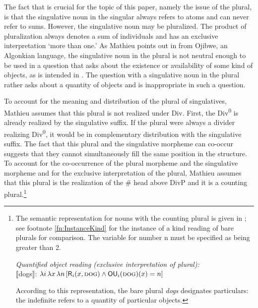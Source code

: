 \documentclass[output=paper,colorlinks,citecolor=brown,
]{langscibook}
\newcommand{\sib}[1]{$\llbracket${#1}$\rrbracket$} %
\newcommand{\cnst}[1]{\textsf{\MakeUppercase{#1}}} %
\begin{document}
The fact that is crucial for the topic of this paper, namely the issue of the plural, is that the singulative noun in the singular always refers to atoms and can never refer to sums. However, the singulative noun may be pluralized. The product of pluralization always denotes a sum of individuals and has an exclusive interpretation `more than one.' As Mathieu points out in  from Ojibwe, an Algonkian language, the singulative noun in the plural is not neutral enough to be used in a question that asks about the existence or availability of some kind of objects, as is intended in . The question with a singulative noun in the plural rather asks about a quantity of objects and is inappropriate in such a question. 

\label{ex:23}
\z
	   
\noindent To account for the meaning and distribution of the plural of singulatives, Mathieu assumes that this plural is not realized under Div. First, the Div\textsuperscript{0} is already realized by the singulative suffix. If the plural were always a divider realizing Div\textsuperscript{0}, it would be in complementary distribution with the singulative suffix. The fact that this plural and the singulative morpheme can co-occur suggests that they cannot simultaneously fill the same position in the structure. To account for the co-occurrence of the plural morpheme and the singulative morpheme and for the exclusive interpretation of the plural, Mathieu assumes that this plural is the realization of the \# head above DivP and it is a counting plural.\footnote{The semantic representation for nouns with the counting plural is given in ; see footnote \ref{fn:InstanceKind} for the instance of a kind reading of bare plurals for comparison. The variable for number n must be specified as being greater than 2.

\ea \textit{Quantified object reading {(}exclusive interpretation of plural{)}:}\\
\sib{dogs}: $\lambda i \, \lambda x \, \lambda n \, [ \cnst{r}_i (x, \textsc{dog}) \wedge \cnst{ou}_i (\textsc{dog})(x) = n ]$  \hfill \citep[7]{Grimm2013} 
\label{ex:QuantObj}
\z

\noindent According to this representation, the bare plural \textit{dogs} designates particulars: the indefinite refers to a quantity of particular objects.} 
\end{document}
